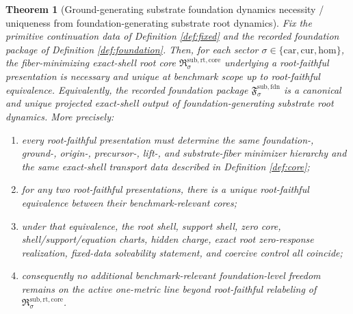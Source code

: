 \documentclass[11pt]{article}
\newcommand{\Car}{\mathrm{car}}
\newcommand{\Cur}{\mathrm{cur}}
\newcommand{\Hom}{\mathrm{hom}}
\newcommand{\FoundationPackage}{\mathfrak F^{\mathrm{sub,fdn}}}
\newcommand{\RootCore}{\mathfrak R^{\mathrm{sub,rt,core}}}
\newtheorem{theorem}{Theorem}
\begin{document}
\begin{theorem}[Ground-generating substrate foundation dynamics necessity / uniqueness from foundation-generating substrate root dynamics]
\label{thm:main}
Fix the primitive continuation data of Definition \ref{def:fixed} and the recorded foundation package of Definition \ref{def:foundation}. Then, for each sector \(\sigma\in\{\Car,\Cur,\Hom\}\), the fiber-minimizing exact-shell root core \(\RootCore_{\sigma}\) underlying a root-faithful presentation is necessary and unique at benchmark scope up to root-faithful equivalence. Equivalently, the recorded foundation package \(\FoundationPackage_{\sigma}\) is a canonical and unique projected exact-shell output of foundation-generating substrate root dynamics. More precisely:
\begin{enumerate}
    \item every root-faithful presentation must determine the same foundation-, ground-, origin-, precursor-, lift-, and substrate-fiber minimizer hierarchy and the same exact-shell transport data described in Definition \ref{def:core};
    \item for any two root-faithful presentations, there is a unique root-faithful equivalence between their benchmark-relevant cores;
    \item under that equivalence, the root shell, support shell, zero core, shell/support/equation charts, hidden charge, exact root zero-response realization, fixed-data solvability statement, and coercive control all coincide;
    \item consequently no additional benchmark-relevant foundation-level freedom remains on the active one-metric line beyond root-faithful relabeling of \(\RootCore_{\sigma}\).
\end{enumerate}
\end{theorem}
\end{document}
